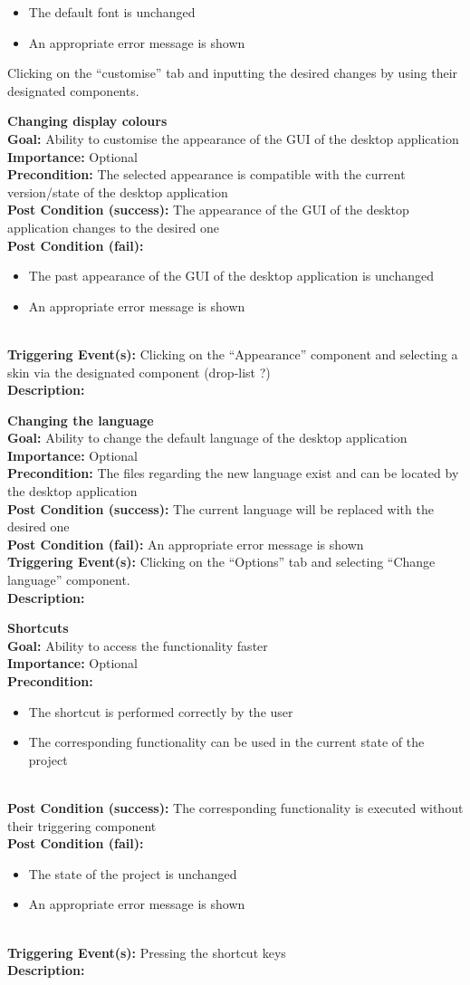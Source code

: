 \documentclass[10pt,a4paper]{report}
\newcommand{\precondition}[1]{
    \textbf{Precondition: } #1 \leavevmode \\
}
\newcommand{\FRODescription}[8]{
    \textbf{#1} \leavevmode \\
    \textbf{Goal: } #2 \leavevmode \\
    \textbf{Importance: } #3 \leavevmode \\
    \precondition{#4}
    \textbf{Post Condition (success): } #5 \leavevmode \\
    \textbf{Post Condition (fail): } #6 \leavevmode \\
    \textbf{Triggering Event(s): } #7 \leavevmode \\
    \textbf{Description: } \leavevmode \\
    #8}
\begin{document}
\begin{FRO}
{\begin{itemize}
        \item The default font is unchanged
        \item An appropriate error message is shown
    \end{itemize}}
    {Clicking on the “customise” tab and inputting the desired changes by using their designated components.}
    \item \FRODescription{Changing display colours}
    {Ability to customise the appearance of the GUI of the desktop application}
    {Optional}
    {The selected appearance is compatible with the current version/state of the desktop application}
    {The appearance of the GUI of the desktop application changes to the desired one}
    {\begin{itemize}
        \item The past appearance of the GUI of the desktop application is unchanged
        \item An appropriate error message is shown
    \end{itemize}}
    {Clicking on the “Appearance” component and selecting a skin via the designated component (drop-list ?)}
    \item \FRODescription{Changing the language}
    {Ability to change the default language of the desktop application}
    {Optional}
    {The files regarding the new language exist and can be located by the desktop application}
    {The current language will be replaced with the desired one}
    {An appropriate error message is shown}
    {Clicking on the “Options” tab and selecting “Change language” component.}
    \item \FRODescription{Shortcuts}
    {Ability to access the functionality faster}
    {Optional}
    {\begin{itemize}
        \item The shortcut is performed correctly by the user
        \item The corresponding functionality can be used in the current state of the project
    \end{itemize}}
    {The corresponding functionality is executed without their triggering component}
    {\begin{itemize}
        \item The state of the project is unchanged
        \item An appropriate error message is shown
    \end{itemize}}
    {Pressing the shortcut keys}
    \item {}

\end{FRO}
\end{document}
